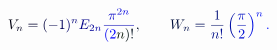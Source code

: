 \documentclass[12pt]{article}
\begin{document}
\makeatletter
\renewcommand*{\@textcolor}[3]{%
  \protect\leavevmode
  \begingroup
    \color#1{#2}#3%
  \endgroup
}
\makeatother
\begin{displaymath}
\mathcolor[RGB]{0,0,15}{V} _ { \mathcolor[RGB]{0,0,30}{n} } \mathcolor[RGB]{0,0,45}{=} \mathcolor[RGB]{0,0,60}{(} \mathcolor[RGB]{0,0,75}{-} \mathcolor[RGB]{0,0,90}{1} \mathcolor[RGB]{0,0,105}{)} ^ { \mathcolor[RGB]{0,0,120}{n} } \mathcolor[RGB]{0,0,135}{E} _ { \mathcolor[RGB]{0,0,150}{2} \mathcolor[RGB]{0,0,165}{n} } \mathcolor[RGB]{0,0,180}{\frac { \mathcolor[RGB]{0,0,195}{\pi} ^ { \mathcolor[RGB]{0,0,210}{2} \mathcolor[RGB]{0,0,225}{n} } } { \mathcolor[RGB]{0,0,240}{(} \mathcolor[RGB]{0,0,255}{2} \mathcolor[RGB]{0,15,0}{n} \mathcolor[RGB]{0,15,15}{)} \mathcolor[RGB]{0,15,30}{!} } } \mathcolor[RGB]{0,15,45}{,} \qquad \mathcolor[RGB]{0,15,60}{W} _ { \mathcolor[RGB]{0,15,75}{n} } \mathcolor[RGB]{0,15,90}{=} \mathcolor[RGB]{0,15,105}{\frac { \mathcolor[RGB]{0,15,120}{1} } { \mathcolor[RGB]{0,15,135}{n} \mathcolor[RGB]{0,15,150}{!} } } \mathcolor[RGB]{0,15,165}{\left(} \mathcolor[RGB]{0,15,180}{\frac { \mathcolor[RGB]{0,15,195}{\pi} } { \mathcolor[RGB]{0,15,210}{2} } } \mathcolor[RGB]{0,15,225}{\right)} ^ { \mathcolor[RGB]{0,15,240}{n} } \mathcolor[RGB]{0,15,255}{.}
\end{displaymath}
\end{document}
